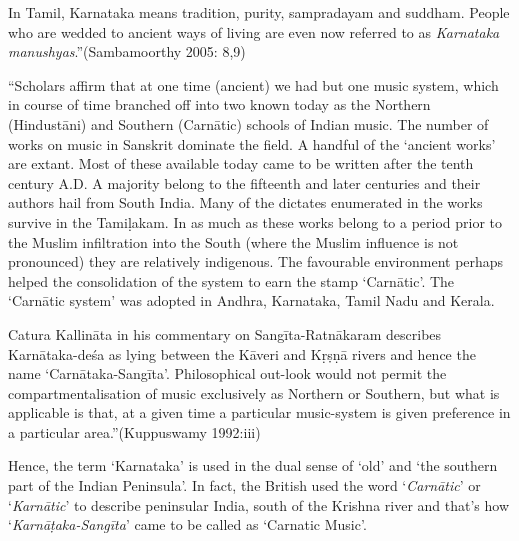 \begin{myquote}
In Tamil, Karnataka means tradition, purity, sampradayam and suddham. People who are wedded to ancient ways of living are even now referred to as \textit{Karnataka manushyas}.”\hfill (Sambamoorthy 2005: 8,9)
\end{myquote}

\begin{myquote}
“Scholars affirm that at one time (ancient) we had but one music system, which in course of time branched off into two known today as the Northern (Hindustāni) and Southern (Carnātic) schools of Indian music. The number of works on music in Sanskrit dominate the field. A handful of the ‘ancient works’ are extant. Most of these available today came to be written after the tenth century A.D. A majority belong to the fifteenth and later centuries and their authors hail from South India. Many of the dictates enumerated in the works survive in the Tamiḷakam. In as much as these works belong to a period prior to the Muslim infiltration into the South (where the Muslim influence is not pronounced) they are relatively indigenous. The favourable environment perhaps helped the consolidation of the system to earn the stamp ‘Carnātic’. The ‘Carnātic system’ was adopted in Andhra, Karnataka, Tamil Nadu and Kerala.
\end{myquote}

\begin{myquote}
Catura Kallināta in his commentary on Sangīta-Ratnākaram describes Karnātaka-deśa as lying between the Kāveri and Kṛṣṇā rivers and hence the name ‘Carnātaka-Sangīta’. Philosophical out-look would not permit the compartmentalisation of music exclusively as Northern or Southern, but what is applicable is that, at a given time a particular music-system is given preference in a particular area.”\hfill (Kuppuswamy 1992:iii)
\end{myquote}

Hence, the term ‘Karnataka’ is used in the dual sense of ‘old’ and ‘the southern part of the Indian Peninsula’. In fact, the British used the word ‘\textit{Carnātic}’ or ‘\textit{Karnātic}’ to describe peninsular India, south of the Krishna river and that’s how ‘\textit{Karnāṭaka-Sangīta}’ came to be called as ‘Carnatic Music’. 

